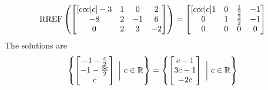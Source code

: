 \documentclass{sbgLAexam}
\begin{document}
\begin{solution}
$$\operatorname{RREF}\left(\begin{bmatrix}[ccc|c] -3 & 1 & 0 & 2 \\ -8 & 2 & -1 & 6 \\ 0 & 2 & 3 & -2 \end{bmatrix} \right) = \begin{bmatrix}[ccc|c] 1 & 0 & \frac{1}{2} & -1 \\ 0 & 1 & \frac{3}{2} & -1 \\ 0 & 0 & 0 & 0 \end{bmatrix}$$
The solutions are $$\left\{ \begin{bmatrix} -1-\frac{c}{2} \\ -1-\frac{3c}{2} \\ c \end{bmatrix}\ \bigg|\ c\in \mathbb{R}\right\} = \left\{ \begin{bmatrix} c-1 \\ 3c-1 \\ -2c  \end{bmatrix}\ \bigg|\ c\in \mathbb{R}\right\}$$
\end{solution}
\end{document}
